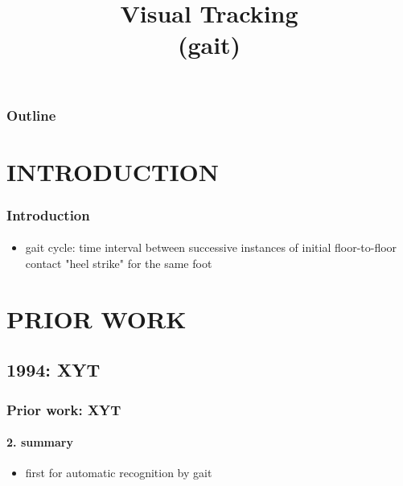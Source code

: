 
\title{Visual Tracking \\ (gait)}
\begin{frame}[plain]\logoTechTower
	\titlepage
\end{frame}

\begin{frame}
\frametitle{Outline}
\logoCSIPCPL\logoTechTower
	\setcounter{tocdepth}{1}	
	\tableofcontents
\end{frame}

\section{INTRODUCTION}
\begin{frame}
\frametitle{Introduction}
\framesubtitle{}
\logoCSIPCPL\mypagenum
	\begin{itemize}
		\item gait cycle: time interval between successive instances of initial floor-to-floor contact "heel strike" for the same foot 
	\end{itemize}
\end{frame}

\section{PRIOR WORK}
\subsection{1994: XYT}
\begin{frame}
\frametitle{Prior work: XYT}
\framesubtitle{2. summary}
\logoCSIPCPL\mypagenum
	\begin{itemize}
		\item first for automatic recognition by gait
	\end{itemize}
\end{frame}


